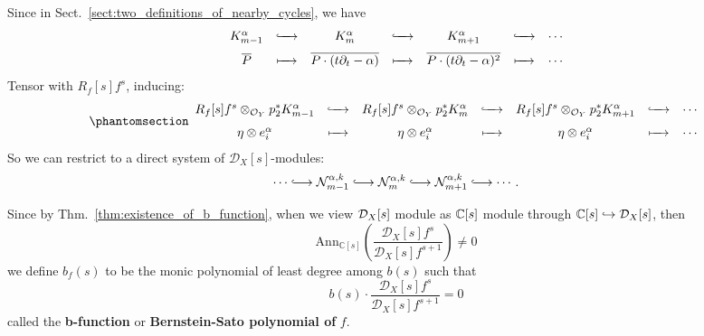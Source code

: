 Since in Sect.~\ref{sect:two_definitions_of_nearby_cycles}, we have
\begin{equation*}
    \begin{array}{ccccccc}
        K_{m-1}^{\alpha} & \lhook\joinrel\xrightarrow{\quad} & K_m^{\alpha}                              & \lhook\joinrel\xrightarrow{\quad} & K_{m+1}^{\alpha}                            & \lhook\joinrel\xrightarrow{\quad} & \cdots \\[1.5ex]
        \overline P      & \xmapsto{\quad}                   & \overline{P \cdot (t\partial_t - \alpha)} & \xmapsto{\quad}                   & \overline{P \cdot (t\partial_t - \alpha)^2} & \xmapsto{\quad}                   & \cdots
    \end{array}
\end{equation*}
Tensor with $R_f[s]f^s$, inducing:
\begin{equation*}\phantomsection\label{construction_of_direct_system_of_N_m_alpha_k}
    \begin{array}{ccccccc}
        R_f[s]f^s \otimes_{\Oy} p_2^* K_{m-1}^{\alpha} & \lhook\joinrel\xrightarrow{\quad} & R_f[s]f^s \otimes_{\Oy} p_2^* K_m^{\alpha} & \lhook\joinrel\xrightarrow{\quad} & R_f[s]f^s \otimes_{\Oy} p_2^* K_{m+1}^{\alpha} & \lhook\joinrel\xrightarrow{\quad} & \cdots \\[1.5ex]
        \eta \otimes e^{\alpha}_i                      & \xmapsto{\quad}                   & \eta \otimes e^{\alpha}_i                  & \xmapsto{\quad}                   & \eta \otimes e^{\alpha}_i                      & \xmapsto{\quad}                   & \cdots
    \end{array}
\end{equation*}
So we can restrict to a direct system of $\mathcal{D}_X[s]$-modules:
\[
    \cdots \lhook\joinrel\longrightarrow \mathcal{N}_{m-1}^{\alpha,k} \lhook\joinrel\longrightarrow \mathcal{N}_m^{\alpha,k} \lhook\joinrel\longrightarrow \mathcal{N}_{m+1}^{\alpha,k} \lhook\joinrel\longrightarrow \cdots .
\]

Since by Thm.~\ref{thm:existence_of_b_function}, when we view $\mathcal{D}_X[s]$ module as $\mathbb{C}[s]$ module
through $\mathbb{C}[s]\hookrightarrow \mathcal{D}_X[s]$, then
\[
    \mathrm{Ann}_{\mathbb{C}[s]}\left(\frac{\mathcal{D}_X[s] f^s}{\mathcal{D}_X[s] f^{s+1}}\right)\neq 0
\]
we define $b_f(s)$ to be the monic polynomial of least degree among $b(s)$ such that
\[
    b(s) \cdot \frac{\mathcal{D}_X[s] f^s}{\mathcal{D}_X[s] f^{s+1}} = 0
\]
called the \textbf{b-function} or \textbf{Bernstein-Sato polynomial of} $f$.

